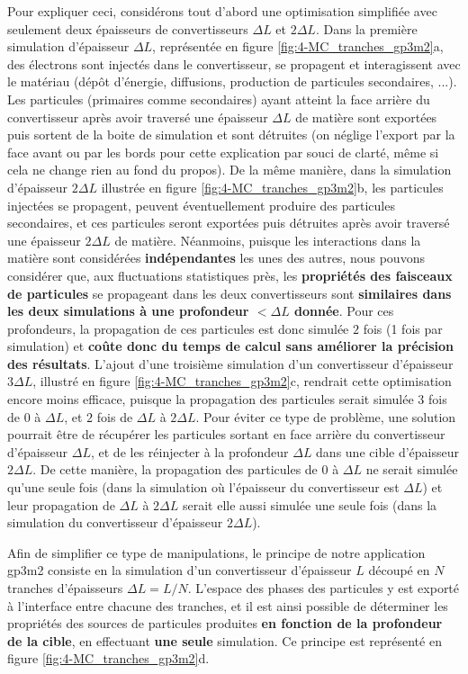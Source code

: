 \begin{refsection}
Pour expliquer ceci, considérons tout d'abord une optimisation simplifiée avec seulement deux épaisseurs de convertisseurs $\Delta L$ et $2 \Delta L$. Dans la première simulation d'épaisseur $\Delta L$, représentée en figure \ref{fig:4-MC_tranches_gp3m2}a, des électrons sont injectés dans le convertisseur, se propagent et interagissent avec le matériau (dépôt d'énergie, diffusions, production de particules secondaires, ...). Les particules (primaires comme secondaires) ayant atteint la face arrière du convertisseur après avoir traversé une épaisseur $\Delta L$ de matière sont exportées puis sortent de la boite de simulation et sont détruites (on néglige l'export par la face avant ou par les bords pour cette explication par souci de clarté, même si cela ne change rien au fond du propos). De la même manière, dans la simulation d'épaisseur $2 \Delta L$ illustrée en figure \ref{fig:4-MC_tranches_gp3m2}b, les particules injectées se propagent, peuvent éventuellement produire des particules secondaires, et ces particules seront exportées puis détruites après avoir traversé une épaisseur $2 \Delta L$ de matière. Néanmoins, puisque les interactions dans la matière sont considérées \textbf{indépendantes} les unes des autres, nous pouvons considérer que, aux fluctuations statistiques près, les \textbf{propriétés des faisceaux de particules} se propageant dans les deux convertisseurs sont \textbf{similaires dans les deux simulations à une profondeur $<\Delta L$ donnée}. Pour ces profondeurs, la propagation de ces particules est donc simulée $2$ fois (1 fois par simulation) et \textbf{coûte donc du temps de calcul sans améliorer la précision des résultats}. L'ajout d'une troisième simulation d'un convertisseur d'épaisseur $3 \Delta L$, illustré en figure \ref{fig:4-MC_tranches_gp3m2}c, rendrait cette optimisation encore moins efficace, puisque la propagation des particules serait simulée 3 fois de $0$ à $\Delta L$, et $2$ fois de $\Delta L$ à $2 \Delta L$. Pour éviter ce type de problème, une solution pourrait être de récupérer les particules sortant en face arrière du convertisseur d'épaisseur $\Delta L$, et de les réinjecter à la profondeur $\Delta L$ dans une cible d'épaisseur $2 \Delta L$. De cette manière, la propagation des particules de $0$ à $\Delta L$ ne serait simulée qu'une seule fois (dans la simulation où l'épaisseur du convertisseur est $\Delta L$) et leur propagation de $\Delta L$ à $2\Delta L$ serait elle aussi simulée une seule fois (dans la simulation du convertisseur d'épaisseur $2\Delta L$). 

Afin de simplifier ce type de manipulations, le principe de notre application gp3m2 consiste en la simulation d'un convertisseur d'épaisseur $L$ découpé en $N$ tranches d'épaisseurs $\Delta L = L/N$. L'espace des phases des particules y est exporté à l'interface entre chacune des tranches, et il est ainsi possible de déterminer les propriétés des sources de particules produites \textbf{en fonction de la profondeur de la cible}, en effectuant \textbf{une seule} simulation. Ce principe est représenté en figure \ref{fig:4-MC_tranches_gp3m2}d.


\end{refsection}
